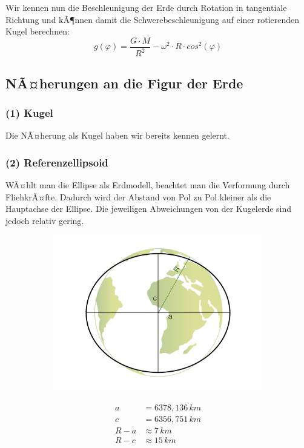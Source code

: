 Wir kennen nun die Beschleunigung der Erde durch Rotation in tangentiale Richtung und kÃ¶nnen damit die Schwerebeschleunigung auf einer rotierenden Kugel berechnen:  \begin{equation*}
	g(\varphi) = \frac{G \cdot M}{R^2} - \omega^2 \cdot R \cdot cos^2(\varphi) 
\end{equation*}

\subsection*{NÃ¤herungen an die Figur der Erde}
\subsubsection{(1) Kugel}
Die NÃ¤herung als Kugel haben wir bereits kennen gelernt. 

\subsubsection{(2) Referenzellipsoid}
WÃ¤hlt man die Ellipse als Erdmodell, beachtet man die Verformung durch FliehkrÃ¤fte. Dadurch wird der Abstand von Pol zu Pol kleiner als die Hauptachse der Ellipse. Die jeweiligen Abweichungen von der Kugelerde sind jedoch relativ gering. 

\begin{figure}[H]
	\begin{subfigure}[m]{0.5\textwidth}
	\centering
		\includegraphics[scale=0.2]{GravimetrieBilder/Referenzellipsoid}
	\end{subfigure}
	\begin{subfigure}[m]{0.5\textwidth}
	\centering
		\[\begin{aligned}
			a &= 6378,136\,\si{km}\\
	c &= 6356, 751\,\si{km}\\
	R - a &\approx 7\,\si{km}\\
	R - c &\approx 15\,\si{km}
		\end{aligned}\]
	\end{subfigure}
\end{figure}

